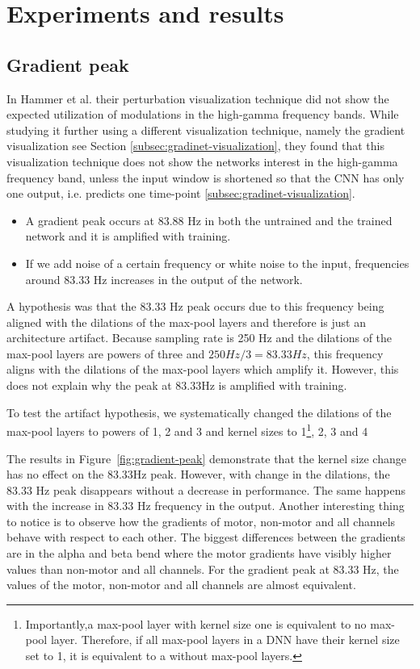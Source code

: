 \chapter{Experiments and results}
\label{ch:exp}

\section{Gradient peak}\label{sec:gradient-peak}
In Hammer et al. \cite{Hammer-2021} their perturbation visualization technique did not show the expected utilization of modulations in the high-gamma frequency bands. 
While studying it further using a different visualization technique, namely the gradient visualization see Section \ref{subsec:gradinet-visualization}, they found that this visualization technique does not show the networks interest in the high-gamma frequency band, unless the input window is shortened so that the CNN has only one output, i.e. predicts one time-point \ref{subsec:gradinet-visualization}. 

\begin{itemize}
\item[1.] A gradient peak occurs at 83.88 Hz in both the untrained and the trained network and it is amplified with training.
\item[2.] If we add noise of a certain frequency or white noise to the input, frequencies around 83.33 Hz increases in the output of the network.
\end{itemize}

A hypothesis was that the 83.33 Hz peak occurs due to this frequency being aligned with the dilations of the max-pool layers and therefore is just an architecture artifact.
Because sampling rate is 250 Hz and the dilations of the max-pool layers are powers of three and $250 Hz / 3 = 83.33 Hz$, this frequency aligns with the dilations of the max-pool layers which amplify it.
However, this does not explain why the peak at 83.33Hz is amplified with training.

To test the artifact hypothesis, we systematically changed the dilations of the max-pool layers to powers of 1, 2 and 3 and kernel sizes to 1\footnote{Importantly,a max-pool layer with kernel size one is equivalent to no max-pool layer. Therefore, if all max-pool layers in a DNN have their kernel size set to 1, it is equivalent to a  without max-pool layers.}, 2, 3 and 4

The results in Figure~\ref{fig:gradient-peak} demonstrate that the kernel size change has no effect on the 83.33Hz peak.
However, with change in the dilations, the 83.33 Hz peak disappears without a decrease in performance.
The same happens with the increase in 83.33 Hz frequency in the output.
Another interesting thing to notice is to observe how the gradients of motor, non-motor and all channels behave with respect to each other.
The biggest differences between the gradients are in the alpha and beta bend where the motor gradients have visibly higher values than non-motor and all channels.
For the gradient peak at 83.33 Hz, the values of the motor, non-motor and all channels are almost equivalent.

